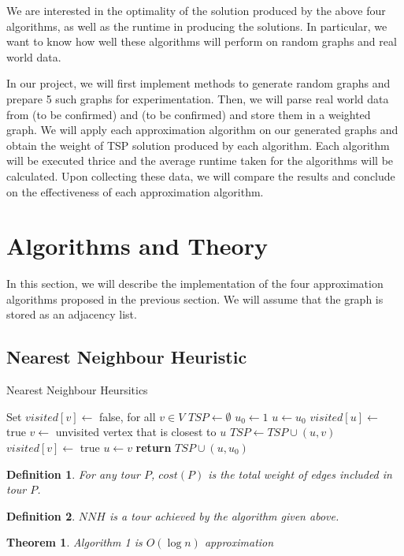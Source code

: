 \documentclass[paper=a4, fontsize=11pt]{scrartcl}	%
\numberwithin{equation}{section}		%
\numberwithin{figure}{section}			%
\numberwithin{table}{section}				%
\newtheorem{theorem}{Theorem}
\newtheorem{definition}{Definition}
\begin{document}
We are interested in the optimality of the solution produced by the above four algorithms, as well as the runtime in producing the solutions. In particular, we want to know how well these algorithms will perform on random graphs and real world data. 

In our project, we will first implement methods to generate random graphs and prepare 5 such graphs for experimentation. Then, we will parse real world data from (to be confirmed) and (to be confirmed) and store them in a weighted graph. We will apply each approximation algorithm on our generated graphs and obtain the weight of TSP solution produced by each algorithm. Each algorithm will be executed thrice and the average runtime taken for the algorithms will be calculated. Upon collecting these data, we will compare the results and conclude on the effectiveness of each approximation algorithm.

\section{Algorithms and Theory}

In this section, we will describe the implementation of the four approximation algorithms proposed in the previous section. We will assume that the graph is stored as an adjacency list. 

\subsection{Nearest Neighbour Heuristic}
\begin{algorithm}
\caption{Nearest Neighbour Heursitics}\label{neighbour}
\begin{algorithmic}[1]
   \State Set $visited[v]\gets$ false, for all $v\in V$
   \State $TSP\gets\emptyset$
   \State $u_{0}\gets 1$ 
   \State $u\gets u_{0}$
   \State $visited[u]\gets$ true
      \State $v\gets$ unvisited vertex that is closest to $u$
      \State $TSP\gets TSP\cup(u,v)$
      \State $visited[v]\gets$ true
      \State $u\gets v$
   \EndWhile\label{nearestneighbourwhile}
   \State \textbf{return} $TSP\cup(u,u_{0})$
\EndProcedure
\end{algorithmic}
\end{algorithm}

\begin{definition}
For any tour $P$, $cost(P)$ is the total weight of edges included in tour $P$.
\end{definition}
\begin{definition}
$NNH$ is a tour achieved by the algorithm given above.
\end{definition}
\begin{theorem}
Algorithm 1 is $O(\log n)$ approximation
\end{theorem}
\end{document}
